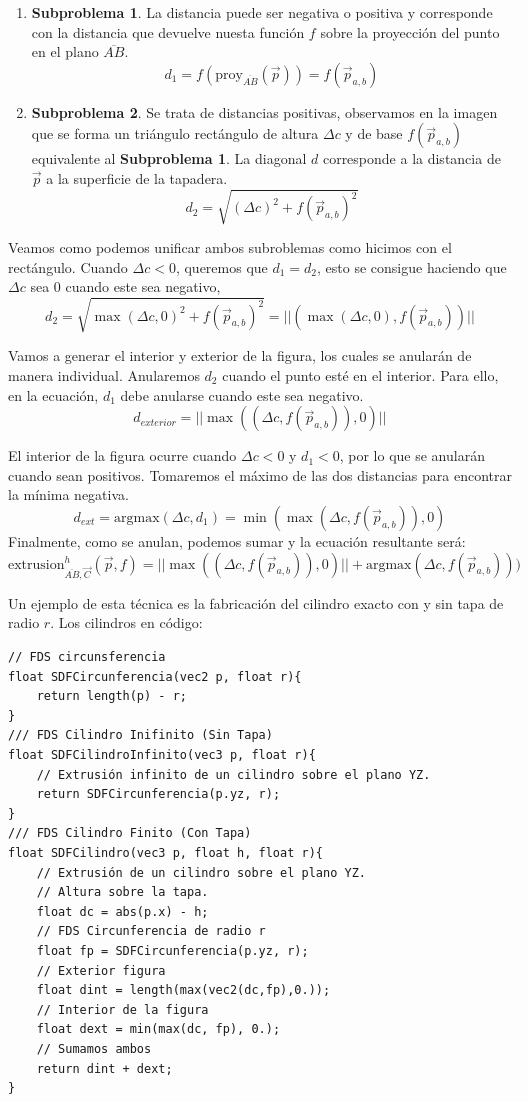 \begin{enumerate}
    \item \textbf{Subproblema 1}. La distancia puede ser negativa o positiva y corresponde con la distancia que devuelve nuesta función \(f\) sobre la proyección del punto en el plano \(\overline{AB}\).
    \[d_1=f(\text{proy}_{\overline{AB}}(\Vec{p}))=f(\Vec{p}_{a,b})\]
    \item \textbf{Subproblema 2}. Se trata de distancias positivas, observamos en la imagen que se forma un triángulo rectángulo de altura \(\Delta c\) y de base \(f(\Vec{p}_{a,b})\) equivalente al \textbf{Subproblema 1}. La diagonal \(d\) corresponde a la distancia de \(\Vec{p}\) a la superficie de la tapadera.
    \[d_2=\sqrt{(\Delta c)^2+f(\Vec{p}_{a,b})^2}\]
\end{enumerate}

Veamos como podemos unificar ambos subroblemas como hicimos con el rectángulo. Cuando \(\Delta c < 0\), queremos que \(d_1=d_2\), esto se consigue haciendo que \(\Delta c\) sea 0 cuando este sea negativo,
\[d_2=\sqrt{\max(\Delta c, 0)^2+f(\Vec{p}_{a,b})^2}=\vert\vert (\max(\Delta c, 0), f(\Vec{p}_{a,b}))\vert\vert\]

Vamos a generar el interior y exterior de la figura, los cuales se anularán de manera individual. Anularemos \(d_2\) cuando el punto esté en el interior. Para ello, en la ecuación, \(d_1\) debe anularse cuando este sea negativo.
\[d_{exterior}=\vert\vert \max((\Delta c, f(\Vec{p}_{a,b})), 0)\vert\vert\]

El interior de la figura ocurre cuando \(\Delta c < 0\) y \(d_1 < 0\), por lo que se anularán cuando sean positivos. Tomaremos el máximo de las dos distancias para encontrar la mínima negativa.
\[d_{ext} = \text{argmax}(\Delta c, d_1) = \min(\max(\Delta c, f(\Vec{p}_{a,b})), 0)\]
Finalmente, como se anulan, podemos sumar y la ecuación resultante será:
\[\text{extrusion}^h_{\overline{AB},\Vec{C}}\left(\Vec{p},f\right)=\vert\vert \max((\Delta c, f(\Vec{p}_{a,b})), 0)\vert\vert +  \text{argmax}(\Delta c, f(\Vec{p}_{a,b}))) \]

Un ejemplo de esta técnica es la fabricación del cilindro exacto con y sin tapa de radio \(r\). Los cilindros en código:
\begin{lstlisting}
// FDS circunsferencia
float SDFCircunferencia(vec2 p, float r){
	return length(p) - r;
}
/// FDS Cilindro Inifinito (Sin Tapa)
float SDFCilindroInfinito(vec3 p, float r){
    // Extrusión infinito de un cilindro sobre el plano YZ.
    return SDFCircunferencia(p.yz, r);
}
/// FDS Cilindro Finito (Con Tapa)
float SDFCilindro(vec3 p, float h, float r){
    // Extrusión de un cilindro sobre el plano YZ.
    // Altura sobre la tapa.
    float dc = abs(p.x) - h;
    // FDS Circunferencia de radio r
    float fp = SDFCircunferencia(p.yz, r);
    // Exterior figura
    float dint = length(max(vec2(dc,fp),0.));
    // Interior de la figura
    float dext = min(max(dc, fp), 0.);
    // Sumamos ambos
    return dint + dext;
}
\end{lstlisting}

